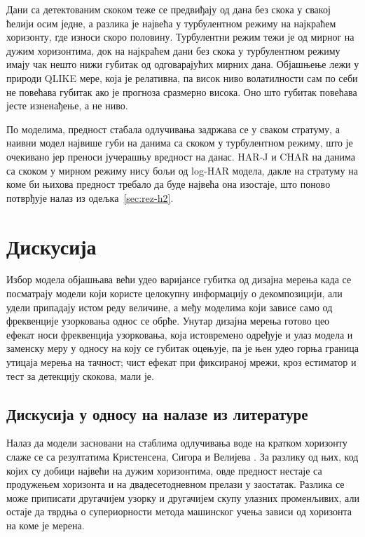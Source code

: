 Дани са детектованим скоком теже се предвиђају од дана без скока у свакој ћелији осим
једне, а разлика је највећа у турбулентном режиму на најкраћем хоризонту, где износи
скоро половину. Турбулентни режим тежи је од мирног на дужим хоризонтима, док на
најкраћем дани без скока у турбулентном режиму имају чак нешто нижи губитак од
одговарајућих мирних дана. Објашњење лежи у природи QLIKE мере, која је релативна, па висок
ниво волатилности сам по себи не повећава губитак ако је прогноза сразмерно висока. Оно
што губитак повећава јесте изненађење, а не ниво.

По моделима, предност стабала одлучивања задржава се у сваком стратуму, а наивни модел
највише губи на данима са скоком у турбулентном режиму, што је очекивано јер преноси
јучерашњу вредност на данас. HAR-J и CHAR на данима са скоком у мирном режиму нису бољи
од log-HAR модела, дакле на стратуму на коме би њихова предност требало да буде највећа
она изостаје, што поново потврђује налаз из одељка~\ref{sec:rez-h2}.

\section{Дискусија}
\label{sec:rez-diskusija}

Избор модела објашњава већи удео варијансе губитка од дизајна мерења када се посматрају
модели који користе целокупну информацију о декомпозицији, али удели припадају истом
реду величине, а међу моделима који зависе само од фреквенције узорковања однос се
обрће. Унутар дизајна мерења готово цео ефекат носи фреквенција узорковања, која
истовремено одређује и улаз модела и заменску меру у односу на коју се губитак оцењује, па је
њен удео горња граница утицаја мерења на тачност; чист ефекат при фиксираној мрежи, кроз
естиматор и тест за детекцију скокова, мали је.

\subsection{Дискусија у односу на налазе из литературе}

Налаз да модели засновани на стаблима одлучивања воде на кратком хоризонту слаже се са
резултатима Кристенсена, Сигора и Велијева \parencite{christensen2023}. За разлику од
њих, код којих су добици највећи на дужим хоризонтима, овде предност нестаје са
продужењем хоризонта и на двадесетодневном прелази у заостатак. Разлика се може
приписати другачијем узорку и другачијем скупу улазних променљивих, али остаје да
тврдња о супериорности метода машинског учења зависи од хоризонта на коме је мерена.

